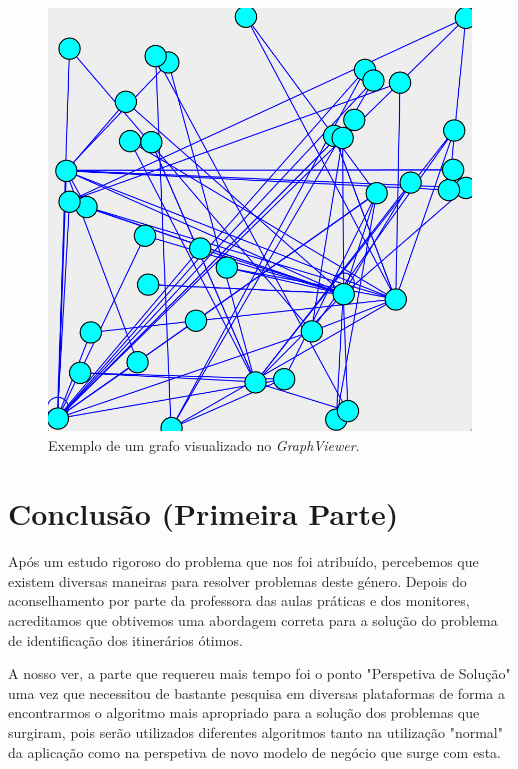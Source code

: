\documentclass[article, a4paper, 12pt, oneside]{memoir}
\begin{document}
\begin{figure}[h!]
  \centerline{\includegraphics[scale=0.6]{graphviewer.png}}
  \caption{Exemplo de um grafo visualizado no \textit{GraphViewer}.}
\end{figure}


\newpage
\chapter[Conclusão (Primeira Parte)][Conclusão (Primeira Parte)]{Conclusão (Primeira Parte)} \label{\thechapter}

Após um estudo rigoroso do problema que nos foi atribuído, percebemos que existem diversas maneiras para resolver problemas deste género. Depois do aconselhamento por parte da professora das aulas práticas e dos monitores, acreditamos que obtivemos uma abordagem correta para a solução do problema de identificação dos itinerários ótimos.

A nosso ver, a parte que requereu mais tempo foi o ponto "Perspetiva de Solução" uma vez que necessitou de bastante pesquisa em diversas plataformas de forma a encontrarmos o algoritmo mais apropriado para a solução dos problemas que surgiram, pois serão utilizados diferentes algoritmos tanto na utilização "normal" da aplicação como na perspetiva de novo modelo de negócio que surge com esta.
\end{document}
